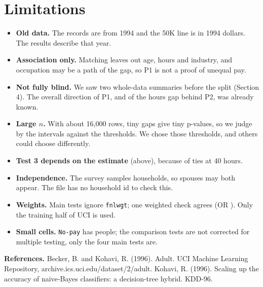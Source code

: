 \documentclass[10pt,a4paper,twocolumn]{article}
\newcommand{\code}[1]{\texttt{#1}}
\begin{document}
\section{Limitations}
\begin{itemize}
  \item \textbf{Old data.} The records are from 1994 and the 50K line is in 1994 dollars. The results describe that year.
  \item \textbf{Association only.} Matching leaves out age, hours and industry, and occupation may be a path of the gap, so P1 is not a proof of unequal pay.
  \item \textbf{Not fully blind.} We saw two whole-data summaries before the split (Section 4). The overall direction of P1, and of the hours gap behind P2, was already known.
  \item \textbf{Large $n$.} With about 16{,}000 rows, tiny gaps give tiny p-values, so we judge by the intervals against the thresholds. We chose those thresholds, and others could choose differently.
  \item \textbf{Test 3 depends on the estimate} (above), because of ties at 40 hours.
  \item \textbf{Independence.} The survey samples households, so spouses may both appear. The file has no household id to check this.
  \item \textbf{Weights.} Main tests ignore \code{fnlwgt}; one weighted check agrees (OR \TOneWOR). Only the training half of UCI is used.
  \item \textbf{Small cells.} \code{No-pay} has \TFourNoPay{} people; the comparison tests are not corrected for multiple testing, only the four main tests are.
\end{itemize}

\small\textbf{References.} Becker, B. and Kohavi, R. (1996). Adult. UCI Machine Learning Repository, archive.ics.uci.edu/dataset/2/adult.
Kohavi, R. (1996). Scaling up the accuracy of naive-Bayes classifiers: a decision-tree hybrid. KDD-96.
\end{document}
